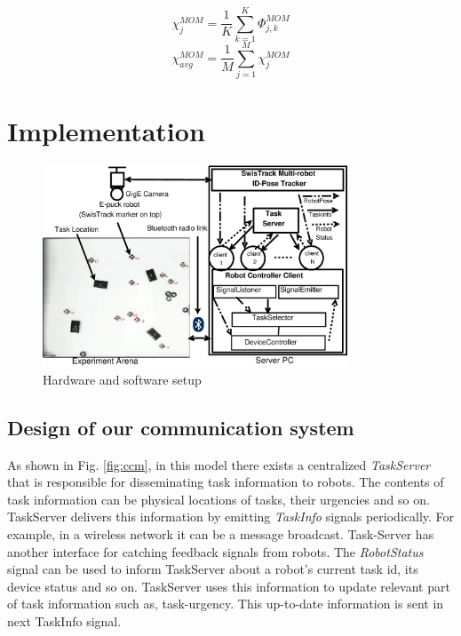 \documentclass{llncs}
\begin{document}
\begin{multicols}{2}
\small
\begin{equation}
\chi_{j}^{MOM}= \frac{1}{K} \sum_{k=1}^{K} \Phi_{j, k}^{MOM}
\label{eqn:sigle-pmw}
\end{equation}
\vspace*{0.2cm}
\begin{equation}
\chi_{avg}^{MOM}= \frac{1}{M} \sum_{j=1}^{M} {\chi_{j}^{MOM}}
\label{eqn:avg-pmw}
\end{equation}
\end{multicols}
\section{Implementation}
\label{sec:impl}
\begin{figure}
\centering
\includegraphics[height=6cm, angle=0]
{./images/RIL-Expt-Setup1.eps}
\caption{\small Hardware and software setup}
\label{fig:setup} %
\end{figure}
\subsection{Design of our communication system}
 As shown in Fig. \ref{fig:ccm}, in this model there exists a centralized \textit{
TaskServer} that is responsible for disseminating task information to robots. The contents of task information can be physical locations of tasks, their urgencies and so on. TaskServer delivers this information by emitting \textit{TaskInfo} signals periodically.
For example, in a wireless network it can be a message broadcast.
Task-Server has another interface for catching feedback signals from robots. The \textit{RobotStatus} signal can be used to inform TaskServer about a robot's current task id, its device status and so on. TaskServer uses this information to update relevant part of task information such as, task-urgency. This up-to-date information is sent in next TaskInfo signal.
\end{document}
